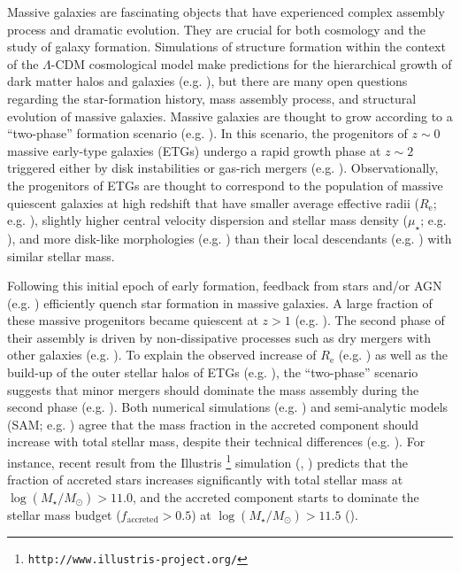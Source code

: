 \documentclass[a4paper,fleqn,usenatbib]{mnras}
\def\logms{{$\log (M_{\star}/M_{\odot})$}}
\def\mden{{$\mu_{\star}$}}
\begin{document}
    Massive galaxies are fascinating objects that have experienced complex assembly 
    process and dramatic evolution.  
    They are crucial for both cosmology and the study of galaxy formation. 
    Simulations of structure formation within the context of the $\Lambda$-CDM 
    cosmological model make predictions for the hierarchical growth of dark matter 
    halos and galaxies (e.g. \citealt{Baugh1996, DeLucia2006}), but there are many 
    open questions regarding the star-formation history, mass assembly process, and 
    structural evolution of massive galaxies. 
    Massive galaxies are thought to grow according to a ``two-phase'' formation 
    scenario (e.g. \citealt{Oser2010, Oser2012}). 
    In this scenario, the progenitors of $z{\sim} 0$ massive early-type galaxies 
    (ETGs) undergo a rapid growth phase at $z{\sim} 2$ triggered either by disk 
    instabilities or gas-rich mergers (e.g. \citealt{Hopkins2008, Dekel2009}). 
    Observationally, the progenitors of ETGs are thought to correspond to the 
    population of massive quiescent galaxies at high redshift that have smaller 
    average effective radii ($R_{\mathrm{e}}$; e.g. \citealt{Trujillo2006, 
    vanDokkum2008, Cimatti2008}), slightly higher central velocity dispersion and 
    stellar mass density (\mden{}; e.g. \citealt{vandeSande2011, Belli2014}), and 
    more disk-like morphologies (e.g. \citealt{vanderWel2011}) than their local 
    descendants (e.g. \citealt{Bezanson2009, vanDokkum2010}) with similar stellar 
    mass.
    
    Following this initial epoch of early formation, feedback from stars and/or AGN 
    (e.g. \citealt{Sijacki2007, Fabian2012}) efficiently quench star formation in 
    massive galaxies. 
    A large fraction of these massive progenitors became quiescent at $z>1$ 
    (e.g. \citealt{Bezanson2009, Kriek2016}). 
    The second phase of their assembly is driven by non-dissipative processes such 
    as dry mergers with other galaxies (e.g. \citealt{Naab2006, Khochfar2006}). 
    To explain the observed increase of $R_{\mathrm{e}}$ (e.g. 
    \citealt{Newman2012, vdWel2014}) as well as the build-up of the outer stellar 
    halos of ETGs (e.g. \citealt{Szomoru2012, Patel2013}), the ``two-phase'' 
    scenario suggests that minor mergers should dominate the mass assembly during 
    the second phase (e.g. \citealt{Hilz2012, Hilz2013, Oogi2013, Bedorf2013, 
    Laporte2013}).
    Both numerical simulations (e.g. \citealt{Oser2010}) and 
    semi-analytic models (SAM; e.g. \citealt{LeeYi2013, LeeYi2017}) agree that the 
    mass fraction in the accreted component should increase with total stellar mass, 
    despite their technical differences (e.g. \citealt{Lackner2012, Cooper2013, 
    Qu2017}).
    For instance, recent result from the Illustris \footnote{
    \texttt{http://www.illustris-project.org/}} simulation 
    (\citealt{Vogelsberger2014}, \citealt{Genel2014}) predicts that the fraction of  
    accreted stars increases significantly with total stellar mass at \logms{}$>11.0$, 
    and the accreted component starts to dominate the stellar mass budget 
    ($f_{\mathrm{accreted}}>0.5$) at \logms{}$>11.5$ (\citealt{RodriguezGomez2016}).
    
\end{document}
